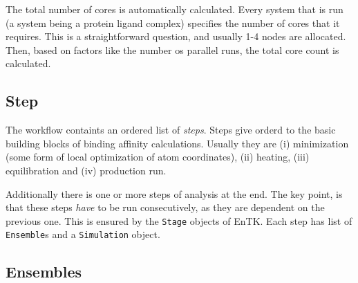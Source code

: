 


The total number of cores is automatically calculated. Every system that is
run (a system being a protein ligand complex) specifies the number of cores
that it requires. This is a straightforward question, and usually 1-4 nodes
are allocated. Then, based on factors like the number os parallel runs, the
total core count is calculated.

\subsection{Step}

The workflow containts an ordered list of \emph{steps}. Steps give orderd to
the basic building blocks of binding affinity calculations. Usually they are
(i) minimization (some form of local optimization of atom coordinates), (ii)
heating, (iii) equilibration and (iv) production run.

Additionally there is one or more steps of analysis at the end. The key
point, is that these steps \emph{have} to be run consecutively, as they are
dependent on the previous one. This is ensured by the \texttt{Stage} objects
of EnTK\@. Each step has list of \texttt{Ensemble}s and a \texttt{Simulation}
object.

\subsection{Ensembles}

